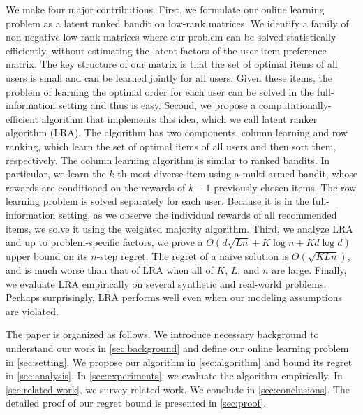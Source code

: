We make four major contributions. First, we formulate our online learning problem as a latent ranked bandit on low-rank matrices. We identify a family of non-negative low-rank matrices where our problem can be solved statistically efficiently, without estimating the latent factors of the user-item preference matrix. The key structure of our matrix is that the set of optimal items of all users is small and can be learned jointly for all users. Given these items, the problem of learning the optimal order for each user can be solved in the full-information setting and thus is easy. Second, we propose a computationally-efficient algorithm that implements this idea, which we call latent ranker algorithm (LRA). The algorithm has two components, column learning and row ranking, which learn the set of optimal items of all users and then sort them, respectively. The column learning algorithm is similar to ranked bandits. In particular, we learn the $k$-th most diverse item using a multi-armed bandit, whose rewards are conditioned on the rewards of $k - 1$ previously chosen items. The row learning problem is solved separately for each user. Because it is in the full-information setting, as we observe the individual rewards of all recommended items,  we solve it using the weighted majority algorithm. Third, we analyze LRA and up to problem-specific factors, we prove a $O\left(d \sqrt{L n} + K \log n + K d \log d\right)$ upper bound on its $n$-step regret. The regret of a naive solution is $O(\sqrt{K L n})$, and is much worse than that of LRA when all of $K$, $L$, and $n$ are large. Finally, we evaluate LRA empirically on several synthetic and real-world problems. Perhaps surprisingly, LRA performs well even when our modeling assumptions are violated.

The paper is organized as follows. We introduce necessary background to understand our work in \cref{sec:background} and define our online learning problem in \cref{sec:setting}. We propose our algorithm in \cref{sec:algorithm} and bound its regret in \cref{sec:analysis}. In \cref{sec:experiments}, we evaluate the algorithm empirically. In \cref{sec:related work}, we survey related work. We conclude in \cref{sec:conclusions}. The detailed proof of our regret bound is presented in \cref{sec:proof}.
